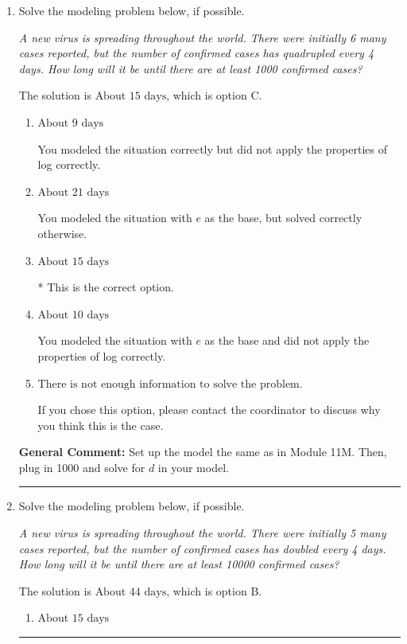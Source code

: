\documentclass{extbook}[14pt]
\newcommand{\litem}[1]{\item #1

\rule{\textwidth}{0.4pt}}
\begin{document}
\begin{enumerate}\litem{
Solve the modeling problem below, if possible.

\begin{center}
    \textit{ A new virus is spreading throughout the world. There were initially 6 many cases reported, but the number of confirmed cases has quadrupled every 4 days. How long will it be until there are at least 1000 confirmed cases? }
\end{center}
The solution is \( \text{About } 15 \text{ days} \), which is option C.\begin{enumerate}[label=\Alph*.]
\item \( \text{About } 9 \text{ days} \)

You modeled the situation correctly but did not apply the properties of log correctly.
\item \( \text{About } 21 \text{ days} \)

You modeled the situation with $e$ as the base, but solved correctly otherwise.
\item \( \text{About } 15 \text{ days} \)

* This is the correct option.
\item \( \text{About } 10 \text{ days} \)

You modeled the situation with $e$ as the base and did not apply the properties of log correctly.
\item \( \text{There is not enough information to solve the problem.} \)

If you chose this option, please contact the coordinator to discuss why you think this is the case.
\end{enumerate}

\textbf{General Comment:} Set up the model the same as in Module 11M. Then, plug in 1000 and solve for $d$ in your model.
}
\litem{
Solve the modeling problem below, if possible.

\begin{center}
    \textit{ A new virus is spreading throughout the world. There were initially 5 many cases reported, but the number of confirmed cases has doubled every 4 days. How long will it be until there are at least 10000 confirmed cases? }
\end{center}
The solution is \( \text{About } 44 \text{ days} \), which is option B.\begin{enumerate}[label=\Alph*.]
\item \( \text{About } 15 \text{ days} \)


\end{enumerate}}
\end{enumerate}
\end{document}
